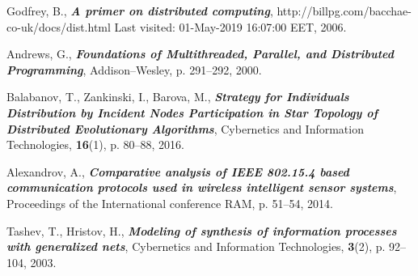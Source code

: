 \documentclass[graybox]{svmult}
\begin{document}
\begin{thebibliography}{99}
 Godfrey, B., \textbf{\textit{A primer on distributed computing}}, http://billpg.com/bacchae-co-uk/docs/dist.html Last visited: 01-May-2019 16:07:00 EET, 2006.

 Andrews, G., \textbf{\textit{Foundations of Multithreaded, Parallel, and Distributed Programming}}, Addison–Wesley, p. 291--292, 2000.

 Balabanov, T., Zankinski, I., Barova, M., \textbf{\textit{Strategy for Individuals Distribution by Incident Nodes Participation in Star Topology of Distributed Evolutionary Algorithms}}, Cybernetics and Information Technologies, \textbf{16}(1), p. 80--88, 2016.

 Alexandrov, A., \textbf{\textit{Comparative analysis of IEEE 802.15.4 based communication protocols used in wireless intelligent sensor systems}}, Proceedings of the International conference RAM, p. 51--54, 2014.

 Tashev, T., Hristov, H., \textbf{\textit{Modeling of synthesis of information processes with generalized nets}}, Cybernetics and Information Technologies, \textbf{3}(2), p. 92--104, 2003.

\end{thebibliography}
\end{document}
